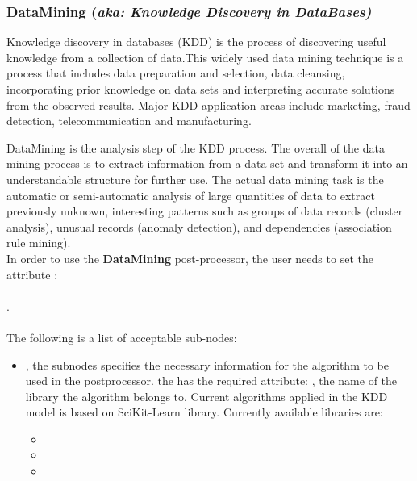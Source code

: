 \subsubsection{DataMining (\textit{aka: Knowledge Discovery in DataBases)}}
\label{subsubsec:DataMining}

Knowledge discovery in databases (KDD) is the process of discovering
 useful knowledge from a collection of data.This widely used data
mining technique is a process that includes data preparation and
selection, data cleansing, incorporating prior knowledge on data
sets and interpreting accurate solutions from the observed results.
Major KDD application areas include marketing, fraud detection,
telecommunication and manufacturing.

DataMining is the analysis step of the KDD process. The overall of
the data mining process is to extract information from a data set
and transform it into an understandable structure for further use.
The actual data mining task is the
automatic or semi-automatic analysis of large quantities of data
to extract previously unknown, interesting patterns such as groups
 of data records (cluster analysis), unusual records (anomaly
detection), and dependencies (association rule mining).
\\
%
In order to use the \textbf{DataMining} post-processor, the user
needs to set the attribute : \\
\\
. \\
\\
The following is a list of acceptable sub-nodes:
\begin{itemize}
  \item {} , the subnodes specifies
  the necessary information for the algorithm to be used in the postprocessor.
  the  has the required attribute: , the name of the
  library the algorithm belongs to. Current algorithms applied in the KDD model
  is based on SciKit-Learn library. Currently available libraries are: %
  \begin{itemize}
    \item {}
    \item {}
    \item {}
  \end{itemize}
\end{itemize}

